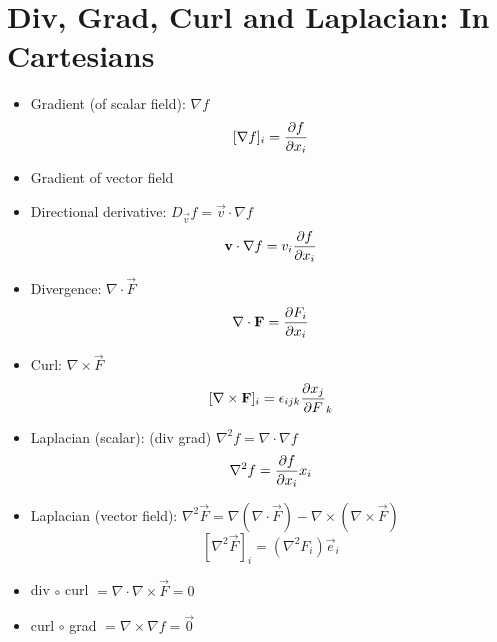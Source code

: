 \section{Div, Grad, Curl and Laplacian: In Cartesians}
\begin{itemize}
      \item Gradient (of scalar field): $\nabla  f$
            \[ [\nabla  f]_i = \frac{\partial{f}}{\partial{x_i}}\]
      \item Gradient of vector field
      \item Directional derivative: $ D_{\vec{v}} f = \vec{v} \cdot \nabla  f$
            \[ \boldsymbol{\mathbf{v}} \cdot \nabla  f = v_i \frac{\partial{f}}{\partial{x_i}}\]
      \item Divergence: $ \nabla \cdot \vec{F}$
            \[ \nabla \cdot \boldsymbol{\mathbf{F}} = \frac{\partial{F_i}}{\partial{x_i}}\]
      \item Curl:  $ \nabla \times \vec{F}$
            \[ [\nabla \times \boldsymbol{\mathbf{F}}]_i = \epsilon_{ijk} \frac{\partial{x_j}}{\partial{F}}_k\]
      \item Laplacian (scalar): (div grad) $\nabla ^2 f = \nabla \cdot \nabla f$
            \[ \nabla ^2 f = \frac{\partial{f}}{\partial{x_i}}{x_i} \]
      \item Laplacian (vector field): $\nabla ^2 \vec{F} = \nabla (\nabla \cdot \vec{F}) - \nabla \times (\nabla \times \vec{F})$
            \[ [\nabla ^2 \vec{F}]_i = (\nabla^2 F_i){\vec{e}_i} \]
      \item div $\circ$ curl $ = \nabla \cdot \nabla \times \vec{F} = 0 $
      \item curl $\circ$ grad $ = \nabla \times \nabla f = \vec{0} $
\end{itemize}

